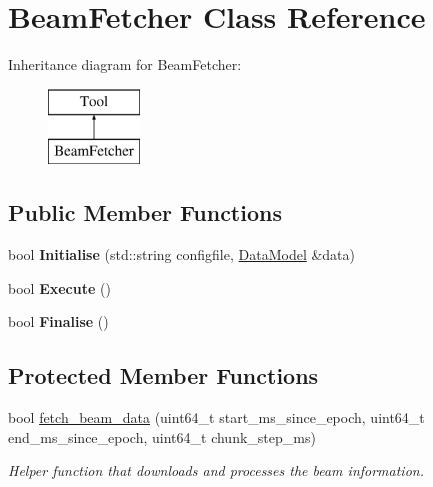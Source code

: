 \hypertarget{classBeamFetcher}{\section{Beam\-Fetcher Class Reference}
\label{classBeamFetcher}
}
Inheritance diagram for Beam\-Fetcher\-:\begin{figure}[H]
\begin{center}
\leavevmode
\includegraphics[height=2.000000cm]{classBeamFetcher}
\end{center}
\end{figure}
\subsection*{Public Member Functions}
\begin{DoxyCompactItemize}
\item 
\hypertarget{classBeamFetcher_a575275aab7b03eb11cafd132fcce3015}{bool {\bfseries Initialise} (std\-::string configfile, \hyperlink{classDataModel}{Data\-Model} \&data)}\label{classBeamFetcher_a575275aab7b03eb11cafd132fcce3015}

\item 
\hypertarget{classBeamFetcher_afb3681ee1fbe9ea81c6268af05b90a5f}{bool {\bfseries Execute} ()}\label{classBeamFetcher_afb3681ee1fbe9ea81c6268af05b90a5f}

\item 
\hypertarget{classBeamFetcher_ae69fe473f0e6d24685eb9e234d97d172}{bool {\bfseries Finalise} ()}\label{classBeamFetcher_ae69fe473f0e6d24685eb9e234d97d172}

\end{DoxyCompactItemize}
\subsection*{Protected Member Functions}
\begin{DoxyCompactItemize}
\item 
\hypertarget{classBeamFetcher_a60c8d28364654bc042de262cacc94dcb}{bool \hyperlink{classBeamFetcher_a60c8d28364654bc042de262cacc94dcb}{fetch\-\_\-beam\-\_\-data} (uint64\-\_\-t start\-\_\-ms\-\_\-since\-\_\-epoch, uint64\-\_\-t end\-\_\-ms\-\_\-since\-\_\-epoch, uint64\-\_\-t chunk\-\_\-step\-\_\-ms)}\label{classBeamFetcher_a60c8d28364654bc042de262cacc94dcb}

\begin{DoxyCompactList}\small\item\em Helper function that downloads and processes the beam information. \end{DoxyCompactList}\end{DoxyCompactItemize}
